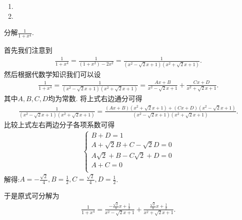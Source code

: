\documentclass[../../main.tex]{subfiles}%
\begin{document}
\begin{solution}
\begin{enumerate}
于是原式可分解为
\begin{align*}
\frac{1}{\left( 1+x^2 \right) \left( 1+x \right) ^2}=\frac{-x}{2\left( 1+x^2 \right)}+\frac{1}{2+2x}+\frac{1}{2\left( 1+x \right) ^2}.
\end{align*}

\item 

\item 
\end{enumerate}

\end{solution}

\begin{example}
分解$\frac{1}{1+x^4}$.
\end{example}
\begin{solution}

首先我们注意到
\begin{align*}
\frac{1}{1+x^4}=\frac{1}{\left( 1+x^2 \right) -2x^2}=\frac{1}{\left( x^2-\sqrt{2}x+1 \right) \left( x^2+\sqrt{2}x+1 \right)}.
\end{align*}
然后根据代数学知识我们可以设
\begin{align}\label{equation:little tech eq3}
\frac{1}{1+x^4}=\frac{1}{\left( x^2-\sqrt{2}x+1 \right) \left( x^2+\sqrt{2}x+1 \right)}=\frac{Ax+B}{x^2-\sqrt{2}x+1}+\frac{Cx+D}{x^2+\sqrt{2}x+1}.  
\end{align}
其中$A,B,C,D$均为常数.
将上式右边通分可得
\begin{align*}
\frac{1}{\left( x^2-\sqrt{2}x+1 \right) \left( x^2+\sqrt{2}x+1 \right)}=\frac{\left( Ax+B \right) \left( x^2+\sqrt{2}x+1 \right) +\left( Cx+D \right) \left( x^2-\sqrt{2}x+1 \right)}{\left( x^2-\sqrt{2}x+1 \right) \left( x^2+\sqrt{2}x+1 \right)}.
\end{align*}
比较上式左右两边分子各项系数可得
\begin{align*}
\begin{cases}
B+D=1\\
A+\sqrt{2}B+C-\sqrt{2}D=0\\
A\sqrt{2}+B-C\sqrt{2}+D=0\\
A+C=0\\
\end{cases}
\end{align*}
解得:$A=-\frac{\sqrt{2}}{4},B=\frac{1}{2},C=\frac{\sqrt{2}}{4},D=\frac{1}{2}$.

于是原式可分解为
\begin{align*}
\frac{1}{1+x^4}=\frac{-\frac{\sqrt{2}}{4}x+\frac{1}{2}}{x^2-\sqrt{2}x+1}+\frac{\frac{\sqrt{2}}{4}x+\frac{1}{2}}{x^2+\sqrt{2}x+1}.
\end{align*}

\end{solution}
\end{document}
